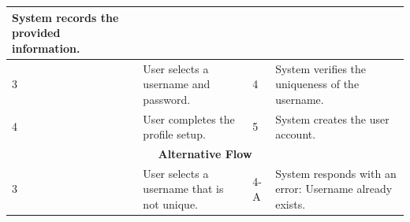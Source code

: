 \documentclass{FastFyp}
\begin{document}
\begin{table}[!ht]
{\begin{tabular}{|lllll|}
  System records the provided information. \\ \hline
\multicolumn{1}{|l|}{3} &
  \multicolumn{2}{l|}{User selects a username and password.} &
  \multicolumn{1}{l|}{4} &
  System verifies the uniqueness of the username. \\ \hline
\multicolumn{1}{|l|}{4} &
  \multicolumn{2}{l|}{User completes the profile setup.} &
  \multicolumn{1}{l|}{5} &
  System creates the user account. \\ \hline
\multicolumn{5}{|c|}{\textbf{Alternative Flow}} \\ \hline
\multicolumn{1}{|l|}{3} &
  \multicolumn{2}{l|}{User selects a username that is not unique.} &
  \multicolumn{1}{l|}{4-A} &
  System responds with an error: Username already exists. \\ \hline
\end{tabular} }
\end{table}
\end{document}
